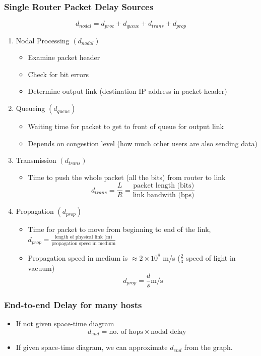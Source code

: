 \documentclass[a4paper]{article}
\begin{document}
\subsubsection{Single Router Packet Delay Sources}
$$d_{nodal} = d_{proc} + d_{queue} + d_{trans} + d_{prop}$$
\begin{enumerate}
	\item Nodal Processing $(d_{nodal})$
	\begin{itemize}[label=$\circ$]
		\item Examine packet header
		\item Check for bit errors
		\item Determine output link (destination IP address in packet header)
	\end{itemize}
	\item Queueing $(d_{queue})$
	\begin{itemize}[label=$\circ$]
		\item Waiting time for packet to get to front of queue for output link
		\item Depends on congestion level (how much other users are also sending data)
	\end{itemize}
	\item Transmission $(d_{trans})$
	\begin{itemize}[label=$\circ$]
		\item Time to push the whole packet (all the bits) from router to link $$ d_{trans} = \frac{L}{R} = \frac{\text{packet length (bits)}}{\text{link bandwith (bps)}}$$
	\end{itemize}
	\item Propagation $(d_{prop})$
	\begin{itemize}[label=$\circ$]
		\item Time for packet to move from beginning to end of the link,
		$d_{prop} = \frac{\text{length of physical link (m)}}{\text{propagation speed in medium}}$
		\item Propagation speed in medium is $\approx 2\times10^{8}$ m/s ($\frac{2}{3}$ speed of light in vacuum)
		$$ d_{prop} = \frac{d}{s} \text{m/s} $$
	\end{itemize}
\end{enumerate}
\subsubsection{End-to-end Delay for many hosts}
\begin{itemize}
	\item If not given space-time diagram $$ d_{end} = \text{no. of hops} \times \text{nodal delay} $$
	\item If given space-time diagram, we can approximate $d_{end}$ from the graph.
\end{itemize}
\end{document}
